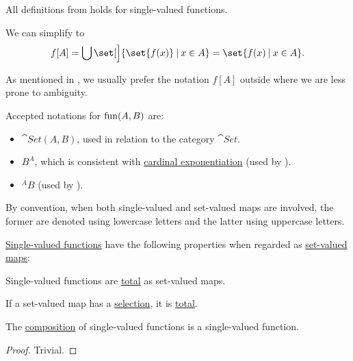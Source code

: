 \begin{comments}
  \item All definitions from  holds for single-valued functions.

  \item We can simplify  to
  \begin{equation*}
    f[A]
    =
    \bigcup \set[\Big]{ \set{ f(x) } \given x \in A }
    =
    \set{ f(x) \given x \in A }.
  \end{equation*}

  As mentioned in , we usually prefer the notation \( f[A] \) outside  where we are less prone to ambiguity.

  \item Accepted notations for \( \operatorname{fun}(A, B) \) are:
  \begin{itemize}
    \item \( \cat{Set}(A, B) \), used in relation to the category \hyperref[def:category_of_small_sets]{\( \cat{Set} \)}.
    \item \( B^A \), which is consistent with \hyperref[def:cardinal_arithmetic/exponentiation]{cardinal exponentiation} (used by ).
    \item \( {}^A B \) (used by ).
  \end{itemize}

  \item By convention, when both single-valued and set-valued maps are involved, the former are denoted using lowercase letters and the latter using uppercase letters.
\end{comments}

\begin{proposition}\label{thm:def:function}
  \hyperref[def:function]{Single-valued functions} have the following properties when regarded as \hyperref[def:function]{set-valued maps}:
  \begin{thmenum}
     Single-valued functions are \hyperref[def:set_valued_map/partial]{total} as set-valued maps.

     If a set-valued map has a \hyperref[def:function/selection]{selection}, it is \hyperref[def:set_valued_map/partial]{total}.

     The \hyperref[def:set_valued_map/composition]{composition} of single-valued functions is a single-valued function.
  \end{thmenum}
\end{proposition}
\begin{proof}
  Trivial.
\end{proof}

